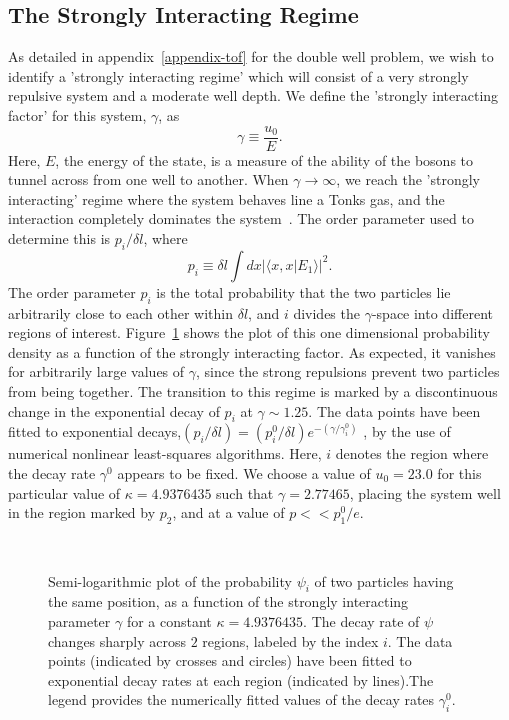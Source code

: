 \subsection{The Strongly Interacting Regime}
As detailed in appendix~\ref{appendix-tof} for the double well problem, we wish to identify a 'strongly interacting regime' which will consist of a very strongly repulsive system and a moderate well depth. We define the 'strongly interacting factor' for this system, $\gamma$, as 
\begin{equation}
\gamma \equiv \frac{u_0}{E}.
\end{equation}
Here, $E$, the energy of the state, is a measure of the ability of the bosons to tunnel across from one well to another. When $\gamma \rightarrow \infty$, we reach the 'strongly interacting' regime where the system behaves line a Tonks gas, and the interaction completely dominates the system~\cite{tonks:gas}. The order parameter used to determine this is $p_i/{\delta l}$, where
\begin{equation}
p_i \equiv \delta l \int dx| \langle x,x | E_1 \rangle |^2.
\end{equation}
The order parameter $p_i$ is the total probability that the two particles lie arbitrarily close to each other within $\delta l$, and $i$ divides the $\gamma$-space into different regions of interest. Figure~\ref{fig:oplattice_tonksplot:chapter-oplattice} shows the plot of this  one dimensional probability density as a function of the strongly interacting factor. As expected, it vanishes for arbitrarily large values of $\gamma$, since the strong repulsions prevent two particles from being together. The transition to this regime is marked by a discontinuous change in the exponential decay of $p_i$ at $\gamma \sim 1.25$. The data points have been fitted to exponential decays,$\left( p_i/{\delta l} \right)=\left( p^0_i/{\delta l} \right) e^{-(\gamma/\gamma^0_i)}$ ,  by the use of numerical nonlinear least-squares algorithms. Here, $i$ denotes the region where the decay rate $\gamma^0$ appears to be fixed. We choose a value of $u_0=23.0$ for this particular value of $\kappa=4.9376435$ such that $\gamma=2.77465$, placing the system well in the region marked by $p_2$, and at a value of $p << p^0_1/e$.

\begin{figure} 
\hspace*{-0.2in}
\ 
\caption{Semi-logarithmic plot of the probability $\psi_i$ of two particles having the same position, as a function of the strongly interacting parameter $\gamma$ for a constant $\kappa=4.9376435$. The decay rate of $\psi$ changes sharply across $2$  regions, labeled by the index $i$. The data points (indicated by crosses and circles) have been fitted to exponential decay rates at each region (indicated by lines).The legend provides the numerically fitted values of the decay rates $\gamma^0_i$.}
\label{fig:oplattice_tonksplot:chapter-oplattice}
\end{figure}

